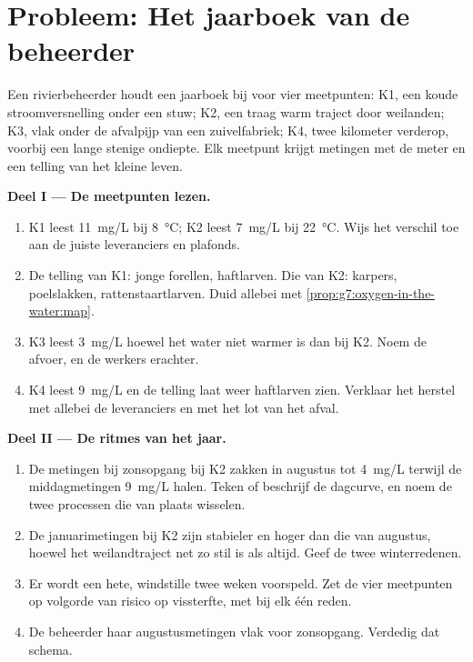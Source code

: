\section{Probleem: Het jaarboek van de beheerder}

\begin{problem}\label{pb:g7:oxygen-in-the-water:1}
Een rivierbeheerder houdt een jaarboek bij voor vier meetpunten: K1, een
koude stroomversnelling onder een stuw; K2, een traag warm traject door
weilanden; K3, vlak onder de afvalpijp van een zuivelfabriek; K4, twee
kilometer verderop, voorbij een lange stenige ondiepte. Elk meetpunt
krijgt metingen met de meter en een telling van het kleine leven.

\medskip\noindent\textbf{Deel I --- De meetpunten lezen.}
\begin{enumerate}
  \item K1 leest \qty{11}{mg/L} bij \qty{8}{\degreeCelsius}; K2 leest
        \qty{7}{mg/L} bij \qty{22}{\degreeCelsius}. Wijs het verschil toe
        aan de juiste leveranciers en plafonds.
  \item De telling van K1: jonge forellen, haftlarven. Die van K2:
        karpers, poelslakken, rattenstaartlarven. Duid allebei met
        \cref{prop:g7:oxygen-in-the-water:map}.
  \item K3 leest \qty{3}{mg/L} hoewel het water niet warmer is dan bij
        K2. Noem de afvoer, en de werkers erachter.
  \item K4 leest \qty{9}{mg/L} en de telling laat weer haftlarven zien.
        Verklaar het herstel met allebei de leveranciers en met het lot
        van het afval.
\end{enumerate}

\medskip\noindent\textbf{Deel II --- De ritmes van het jaar.}
\begin{enumerate}[resume]
  \item De metingen bij zonsopgang bij K2 zakken in augustus tot
        \qty{4}{mg/L} terwijl de middagmetingen \qty{9}{mg/L} halen.
        Teken of beschrijf de dagcurve, en noem de twee processen die van
        plaats wisselen.
  \item De januarimetingen bij K2 zijn stabieler en hoger dan die van
        augustus, hoewel het weilandtraject net zo stil is als altijd.
        Geef de twee winterredenen.
  \item Er wordt een hete, windstille twee weken voorspeld. Zet de vier
        meetpunten op volgorde van risico op vissterfte, met bij elk één
        reden.
  \item De beheerder  haar augustusmetingen vlak voor zonsopgang.
        Verdedig dat schema.
\end{enumerate}


\end{problem}
